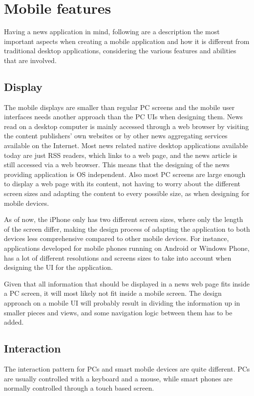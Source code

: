\chapter{Mobile features}

Having a news application in mind, following are a description the most important aspects when creating a mobile application and how it is different from traditional desktop applications, considering the various features and abilities that are involved.

\section{Display}
The mobile displays are smaller than regular PC screens and the mobile user interfaces needs another approach than the PC UIs when designing them. News read on a desktop computer is mainly accessed through a web browser by visiting the content publishers' own websites or by other news aggregating services available on the Internet. Most news related native desktop applications available today are just RSS readers, which links to a web page, and the news article is still accessed via a web browser. This means that the designing of the news providing application is OS independent. Also most PC screens are large enough to display a web page with its content, not having to worry about the different screen sizes and adapting the content to every possible size, as when designing for mobile devices.

As of now, the iPhone only has two different screen sizes, where only the length of the screen differ, making the design process of adapting the application to both devices less comprehensive compared to other mobile devices. For instance, applications developed for mobile phones running on Android or Windows Phone, has a lot of different resolutions and screens sizes to take into account when designing the UI for the application.

Given that all information that should be displayed in a news web page fits inside a PC screen, it will most likely not fit inside a mobile screen. The design approach on a mobile UI will probably result in dividing the information up in smaller pieces and views, and some navigation logic between them has to be added.

\section{Interaction}
The interaction pattern for PCs and smart mobile devices are quite different. PCs are usually controlled with a keyboard and a mouse, while smart phones are normally controlled through a touch based screen.

